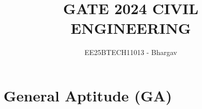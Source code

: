 \documentclass[journal]{IEEEtran}
\begin{document}




\title{GATE 2024 CIVIL ENGINEERING}
\author{EE25BTECH11013 - Bhargav}
\maketitle
{\let\newpage\relax\maketitle}

\renewcommand{\thefigure}{\theenumi}
\renewcommand{\thetable}{\theenumi}
\setlength{\intextsep}{10pt} %


\section*{General Aptitude (GA)}
\end{document}
